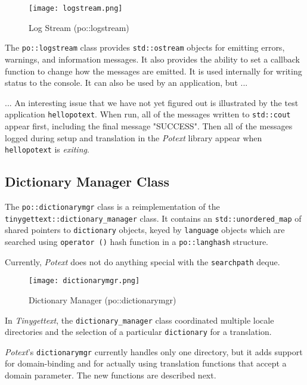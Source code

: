 \begin{figure}[H]
   \centering 
   \texttt{[image: logstream.png]}
   \caption{Log Stream (po::logstream)}
   \label{fig:potext_logstream}
\end{figure}

   The \texttt{po::logstream} class provides \texttt{std::ostream}
   objects for emitting errors, warnings, and information messages.
   It also provides the ability to set a callback function to
   change how the messages are emitted.
   It is used internally for writing status to the console.
   It can also be used by an application, but ...

   ... An interesting issue that we have not yet figured out is
   illustrated by the test application \texttt{hellopotext}.
   When run, all of the messages written to \texttt{std::cout}
   appear first, including the final message "SUCCESS".
   Then all of the messages logged during setup and translation in the
   \textsl{Potext} library appear when \texttt{hellopotext}
   is \textsl{exiting}.

\subsection{Dictionary Manager Class}
\label{subsec:potext_dictionarymgr_class}

   The \texttt{po::dictionarymgr} class is a reimplementation of the
   \texttt{tinygettext::dictionary\_manager} class.
   It contains an \texttt{std::unordered\_map} of
   shared pointers to \texttt{dictionary} objects, keyed by
   \texttt{language} objects which are searched using
   \texttt{operator ()} hash function in a \texttt{po::langhash}
   structure.

   Currently, \textsl{Potext} does not do anything special with the
   \texttt{searchpath} deque.


\begin{figure}[H]
   \centering 
   \texttt{[image: dictionarymgr.png]}
   \caption{Dictionary Manager (po::dictionarymgr)}
   \label{fig:potext_dictionarymgr}
\end{figure}

   In \textsl{Tinygettext}, the \texttt{dictionary\_manager} class 
   coordinated multiple locale directories and the selection of
   a particular \texttt{dictionary} for a translation.

   \textsl{Potext}'s \texttt{dictionarymgr}
   currently handles only one directory, but it
   adds support for domain-binding and for actually using translation
   functions that accept a domain parameter.
   The new functions are described next.

